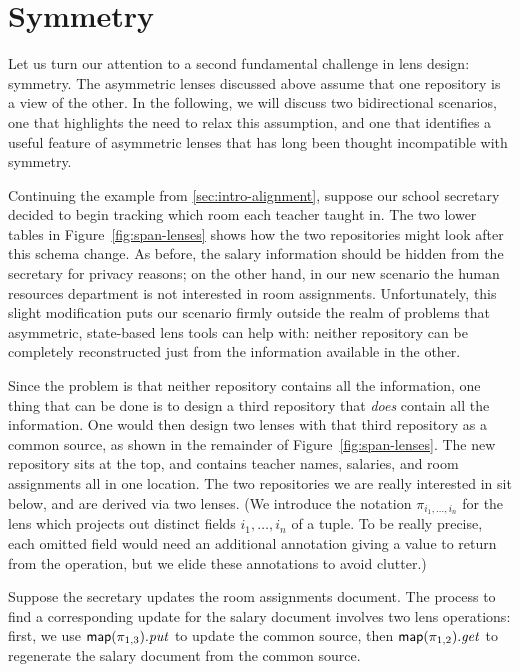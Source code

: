 
\section{Symmetry}
\label{sec:intro-symmetry}
Let us turn our attention to a second fundamental challenge in lens design:
symmetry. The asymmetric lenses discussed above assume that one repository
is a view of the other. In the following, we will discuss two bidirectional
scenarios, one that highlights the need to relax this assumption, and one
that identifies a useful feature of asymmetric lenses that has long been
thought incompatible with symmetry.

Continuing the example from \ref{sec:intro-alignment}, suppose our school
secretary decided to begin tracking which room each teacher taught in. The
two lower tables in Figure~\ref{fig:span-lenses} shows how the two
repositories might look after this schema change. As before, the salary
information should be hidden from the secretary for privacy reasons; on the
other hand, in our new scenario the human resources department is not
interested in room assignments. Unfortunately, this slight modification puts
our scenario firmly outside the realm of problems that asymmetric,
state-based lens tools can help with: neither repository can be completely
reconstructed just from the information available in the other.

Since the problem is that neither repository contains all the information,
one thing that can be done is to design a third repository that \emph{does}
contain all the information. One would then design two lenses with that
third repository as a common source, as shown in the remainder of
Figure~\ref{fig:span-lenses}. The new repository sits at the top, and
contains teacher names, salaries, and room assignments all in one location.
The two repositories we are really interested in sit below, and are derived
via two lenses. (We introduce the notation $\pi_{i_1,\ldots,i_n}$ for the
lens which projects out distinct fields $i_1,\ldots,i_n$ of a tuple. To be
really precise, each omitted field would need an additional annotation
giving a value to return from the \CREATE operation, but we elide these
annotations to avoid clutter.)

Suppose the secretary updates the room assignments document. The process to
find a corresponding update for the salary document involves two lens
operations: first, we use $\mathsf{map}(\pi_{1,3}).\mathit{put}$ to update the common
source, then $\mathsf{map}(\pi_{1,2}).\mathit{get}$ to regenerate the salary document from
the common source.

